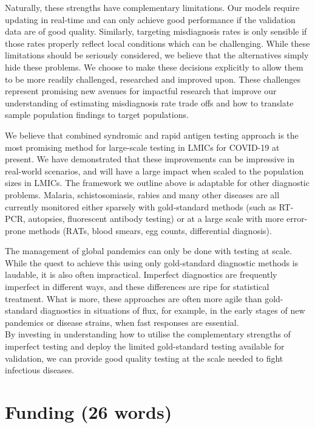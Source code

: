 \documentclass[]{elsarticle} %
\begin{document}
Naturally, these strengths have complementary limitations.
Our models require updating in real-time and can only achieve good performance if the validation data are of good quality.
Similarly, targeting misdiagnosis rates is only sensible if those rates properly reflect local conditions which can be challenging.
While these limitations should be seriously considered, we believe that the alternatives simply hide these problems.
We choose to make these decisions explicitly to allow them to be more readily challenged, researched and improved upon.
These challenges represent promising new avenues for impactful research that improve our understanding of estimating misdiagnosis rate trade offs and how to translate sample population findings to target populations.

We believe that combined syndromic and rapid antigen testing approach is the most promising method for large-scale testing in LMICs for COVID-19 at present.
We have demonstrated that these improvements can be impressive in real-world scenarios, and will have a large impact when scaled to the population sizes in LMICs.
The framework we outline above is adaptable for other diagnostic problems.
Malaria, schistosomiasis, rabies and many other diseases are all currently monitored either sparsely with gold-standard methods (such as RT-PCR, autopsies, fluorescent antibody testing) or at a large scale with more error-prone methods (RATs, blood smears, egg counts, differential diagnosis).

The management of global pandemics can only be done with testing at scale.
While the quest to achieve this using only gold-standard diagnostic methods is laudable, it is also often impractical.
Imperfect diagnostics are frequently imperfect in different ways, and these differences are ripe for statistical treatment.
What is more, these approaches are often more agile than gold-standard diagnostics in situations of flux, for example, in the early stages of new pandemics or disease strains, when fast responses are essential.\\
By investing in understanding how to utilise the complementary strengths of imperfect testing and deploy the limited gold-standard testing available for validation, we can provide good quality testing at the scale needed to fight infectious diseases.

\hypertarget{funding-26-words}{%
\section{Funding (26 words)}\label{funding-26-words}}
\end{document}
